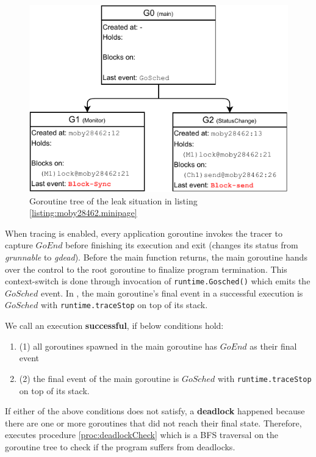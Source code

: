 \begin{figure}[]
\centering
\includegraphics[width=0.75\linewidth]{figs/gtree.pdf}
\caption{Goroutine tree of the leak situation in listing \ref{listing:moby28462.minipage}}
\label{fig:gtree}
\end{figure}

When tracing is enabled, every application goroutine invokes the tracer to capture $GoEnd$ before finishing its execution and exit (\ie changes its status from \textit{grunnable} to \textit{gdead}\cite{goexit-line-of-code}).
%
Before the main function returns, the main goroutine hands over the control to the root goroutine to finalize program termination.
%
This context-switch is done through invocation of \texttt{runtime.Gosched()} which emits the $GoSched$ event.
%
In \goat, the main goroutine's final event in a successful execution is $GoSched$ with \texttt{runtime.traceStop} on top of its stack.
%

We call an execution \textbf{successful}, if below conditions hold:
\begin{enumerate}
  \item (1) all goroutines spawned in the main goroutine has $GoEnd$ as their final event
  \item (2) the final event of the main goroutine is $GoSched$ with \texttt{runtime.traceStop} on top of its stack.
\end{enumerate}
If either of the above conditions does not satisfy, a \textbf{deadlock} happened because there are one or more goroutines that did not reach their final state. Therefore, \goat executes procedure \ref{proc:deadlockCheck} which is a BFS traversal on the goroutine tree to check if the program suffers from deadlocks.

